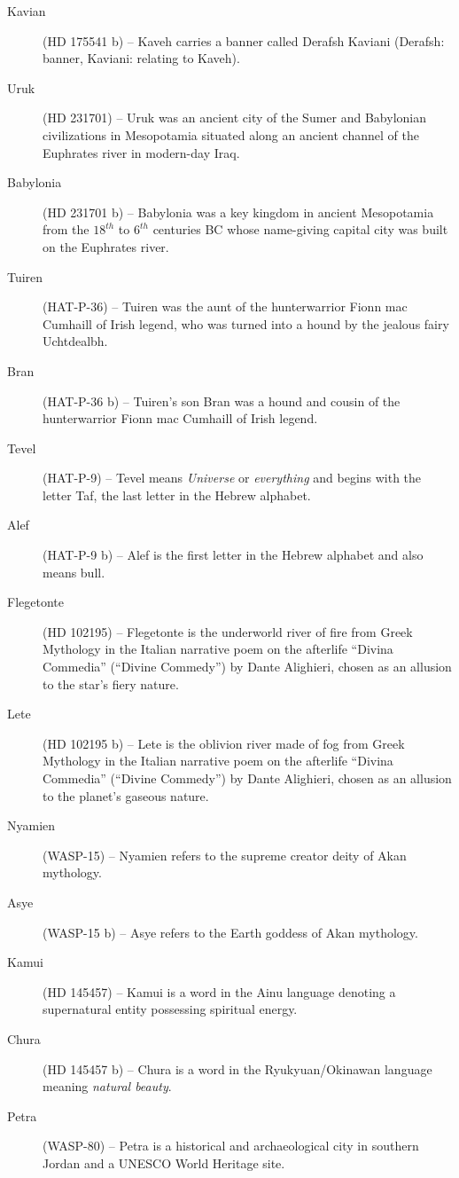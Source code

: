\begin{description}
\item[Kavian] (HD 175541 b) -- Kaveh carries a banner called Derafsh Kaviani (Derafsh: banner, Kaviani: relating to Kaveh).
\item[Uruk] (HD 231701) -- Uruk was an ancient city of the Sumer and Babylonian civilizations in Mesopotamia situated along an ancient channel of the Euphrates river in modern-day Iraq.
\item[Babylonia] (HD 231701 b) -- Babylonia was a key kingdom in ancient Mesopotamia from the $18^{th}$ to $6^{th}$ centuries BC whose name-giving capital city was built on the Euphrates river.
\item[Tuiren] (HAT-P-36) -- Tuiren was the aunt of the hunterwarrior Fionn mac Cumhaill of Irish legend, who was turned into a hound by the jealous fairy Uchtdealbh.
\item[Bran] (HAT-P-36 b) -- Tuiren's son Bran was a hound and cousin of the hunterwarrior Fionn mac Cumhaill of Irish legend.
\item[Tevel] (HAT-P-9) -- Tevel means \textit{Universe} or \textit{everything} and begins with the letter Taf, the last letter in the Hebrew alphabet.
\item[Alef] (HAT-P-9 b) -- Alef is the first letter in the Hebrew alphabet and also means bull.
\item[Flegetonte] (HD 102195) -- Flegetonte is the underworld river of fire from Greek Mythology in the Italian narrative poem on the afterlife ``Divina Commedia'' (``Divine Commedy'') by Dante Alighieri, chosen as an allusion to the star's fiery nature.
\item[Lete] (HD 102195 b) -- Lete is the oblivion river made of fog from Greek Mythology in the Italian narrative poem on the afterlife ``Divina Commedia'' (``Divine Commedy'') by Dante Alighieri, chosen as an allusion to the planet's gaseous nature.
\item[Nyamien] (WASP-15) -- Nyamien refers to the supreme creator deity of Akan mythology.
\item[Asye] (WASP-15 b) -- Asye refers to the Earth goddess of Akan mythology.
\item[Kamui] (HD 145457) -- Kamui is a word in the Ainu language denoting a supernatural entity possessing spiritual energy.
\item[Chura] (HD 145457 b) -- Chura is a word in the Ryukyuan/Okinawan language meaning \textit{natural beauty}.
\item[Petra] (WASP-80) -- Petra is a historical and archaeological city in southern Jordan and a UNESCO World Heritage site.

\end{description}
